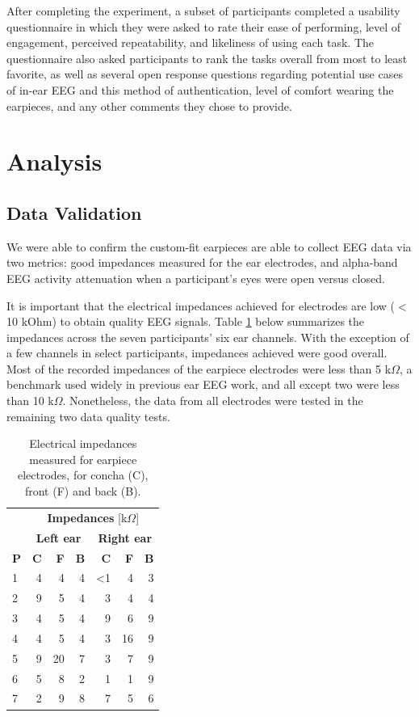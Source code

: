 \documentclass{sigchi}
\begin{document}
 After completing the experiment, a subset of participants completed a usability questionnaire in which they were asked to rate their ease of performing, level of engagement, perceived repeatability, and likeliness of using each task. The questionnaire also asked participants to rank the tasks overall from most to least favorite, as well as several open response questions regarding potential use cases of in-ear EEG and this method of authentication, level of comfort wearing the earpieces, and any other comments they chose to provide.

\section{Analysis}
\subsection{Data Validation}

We were able to confirm the custom-fit earpieces are able to collect EEG data via two metrics: good impedances measured for the ear electrodes, and alpha-band EEG activity attenuation when a participant's eyes were open versus closed.

It is important that the electrical impedances achieved for electrodes are low ($<$10 kOhm) 
to obtain quality EEG signals. Table \ref{tab:impedances} below summarizes the impedances across the seven participants' six ear channels. With the exception of a few channels in select participants, impedances achieved were good overall. Most of the recorded impedances of the earpiece electrodes were less than 5 k\(\Omega\), a benchmark used widely in previous ear EEG work, and all except two were less than 10 k\(\Omega\). Nonetheless, the data from all electrodes were tested in the remaining two data quality tests.

\begin{table}[h]
\begin{center}
\begin{tabular}{lrrrrrr}
& \multicolumn{6}{c}{\textbf{Impedances} [k\(\Omega\)]} \\
\cline{2-7}
& \multicolumn{3}{|c|}{\textbf{Left ear}} & \multicolumn{3}{c|}{\textbf{Right ear}} \\
\textbf{P} & \textbf{C} & \textbf{F} & \textbf{B} & \textbf{C} & \textbf{F} & \textbf{B} \\
\hline
1 & 4 & 4 & 4 & \textless1 & 4 & 3\\
2 & 9 & 5 & 4 & 3 & 4 & 4\\
3 & 4 & 5 & 4 & 9 & 6 & 9\\
4 & 4 & 5 & 4 & 3 & 16 & 9\\
5 & 9 & 20 & 7 & 3 & 7 & 9\\
6 & 5 & 8 & 2 & 1 & 1 & 9\\
7 & 2 & 9 & 8 & 7 & 5 & 6\\
\end{tabular}
\end{center}
\caption{Electrical impedances measured for earpiece electrodes, for concha (C), front (F) and back (B).}
\label{tab:impedances}
\end{table}
\end{document}
